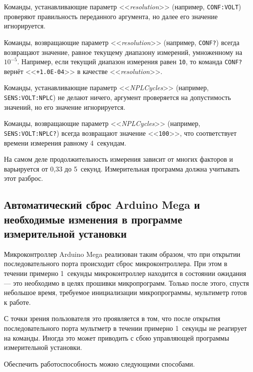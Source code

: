 \documentclass[12pt, a4paper]{article}
\newcommand{\Arduino}{Arduino Mega}
\newcommand{\CMD}[1]{{\tt #1}}
\newcommand{\PARAM}[1]{<<{\it #1}>>}
\newcommand{\RESPONSE}[1]{<<{\tt #1}>>}
\begin{document}
Команды, устанавливающие параметр \PARAM{resolution} (например, \CMD{CONF:VOLT}) проверяют правильность переданного аргумента, но далее его значение игнорируется.

Команды, возвращающие параметр \PARAM{resolution} (например, \CMD{CONF?}) всегда возвращают значение, равное текущему диапазону измерений, умноженному на $10^{-5}$. Например, если текущий диапазон измерения равен \CMD{10}, то команда \CMD{CONF?} вернёт \RESPONSE{+1.0E-04} в качестве \PARAM{resolution}.

Команды, устанавливающие параметр \PARAM{NPLCycles} (например, \CMD{SENS:VOLT:NPLC}) не делают ничего, аргумент  проверяется на допустимость значений, но его значение игнорируется.

Команды, возвращающие параметр \PARAM{NPLCycles} (например, \CMD{SENS:VOLT:NPLC?}) всегда возвращают значение \RESPONSE{100}, что соответствует времени измерения равному 4~секундам.

На самом деле продолжительность измерения зависит от многих факторов и варьируется от 0,33 до 5~секунд. Измерительная программа должна учитывать этот разброс.

\subsection{Автоматический сброс {\Arduino} и необходимые изменения в программе измерительной установки}

Микроконтроллер {\Arduino} реализован таким образом, что при открытии последовательного порта происходит сброс микроконтроллера. При этом в течении примерно 1~секунды микроконтроллер находится в состоянии ожидания --- это необходимо в целях прошивки микропрограмм. Только после этого, спустя небольшое время, требуемое инициализации микропрограммы, мультиметр готов к работе.

С точки зрения пользователя это проявляется в том, что после открытия последовательного порта мультметр в течении примерно 1~секунды не реагирует на команды. Иногда это может приводить с сбою управляющей программы измерительной установки.

Обеспечить работоспособность можно следующими способами.
\end{document}

